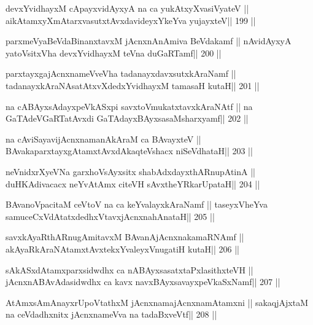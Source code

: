 \begin{shl}
devxYvidhayxM cApayxvidAyxyA na ca yukAtxyX\s vasiVyateV ||
aikAtamxyXmAtarxvasutxtAvxdavideyxYkeYva yujayxteV\hfill || 199 ||
\end{shl}

\begin{shl}
parxmeVyaBeVdaBinanxtavxM jAcnxnAnAmiva BeVdakamf ||
nAvidAyxyA yatoV\s sitxVha devxYvidhayxM teVna duGaRTamf\hfill || 200 ||
\end{shl}

\begin{shl}
parxtayxgajAcnxnameVveVha tadanayxdavxsutxkAraNamf ||
tadanayxkAraNAsatAtxvXdedxYvidhayxM tamasaH kutaH\hfill || 201 ||
\end{shl}

\begin{shl}
na cABAyxsAdayxpeVkASx\s pi savxtoVmukatxtavxkAraNAtf ||
na GaTAdeVGaRTatAvxdi GaTAdayxBAyxsasaMsharxyamf\hfill || 202 ||
\end{shl}

\begin{shl}
na cAviSayavijAcnxnamanAkAraM ca BAvayxteV ||
BAvakaparxtayxgAtamxtAvxdAkaqteVshacx niSeVdhataH\hfill || 203 ||
\end{shl}

\begin{shl}
neVnidxrXyeVNa garxhoV\s sAyxsitx shabAdxdayxthARnupAtinA ||
duHKAdivacacx neYvA\s\s tAmx citeVH sAvxtheYRkarUpataH\hfill || 204 ||
\end{shl}

\begin{shl}
BAvanoVpacitaM ceVtoV na ca keYvalayxkAraNamf ||
taseyxVheYva samuceCxVdAtatxdedhxVtavxjAcnxnahAnataH\hfill || 205 ||
\end{shl}

\begin{shl}
savxkAyaRthARnugAmitavxM BAvanAjAcnxnakamaRNAmf ||
akAyaRkAraNAtamxtAvxtekxYvaleyxV\s nugatiH kutaH\hfill || 206 ||
\end{shl}

\begin{shl}
sAkASxdAtamxparxsidwdhx ca nABAyxsasatxtaPxlasithxteVH ||
jAcnxnABAvAdasidwdhx ca kavx navxBAyxsavayxpeVkaSxNamf\hfill || 207 ||
\end{shl}

\begin{shl}
AtAmxsAmAnayxrUpoVtathxM jAcnxnamajAcnxnamAtamxni ||
sakaqjAjxtaM na ceVdadhxnitx jAcnxnameVva na tadaBxveVtf\hfill || 208 ||
\end{shl}


